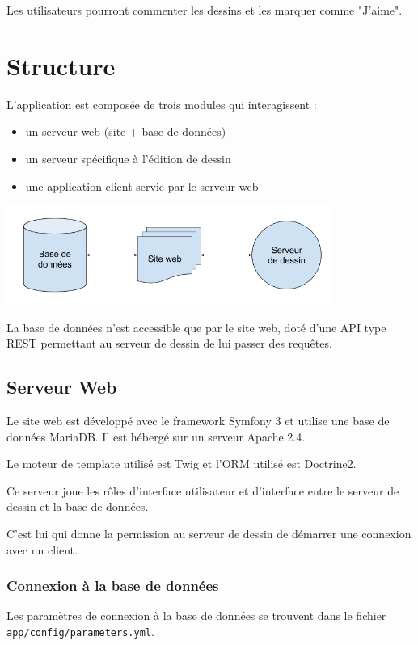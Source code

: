 \documentclass[a4paper]{article}
\begin{document}
Les utilisateurs pourront commenter les dessins et les marquer comme "J'aime".

\section{Structure}
L'application est composée de trois modules qui interagissent :
\begin{itemize}
	\item un serveur web (site + base de données)
	\item un serveur spécifique à l'édition de dessin
	\item une application client servie par le serveur web
\end{itemize}

\begin{center}
	\includegraphics[width=0.8\textwidth]{sketcher_global_structure.png}
\end{center}

La base de données n'est accessible que par le site web, doté d'une API type REST permettant au serveur de dessin de lui passer des requêtes.

\subsection{Serveur Web}
Le site web est développé avec le framework \cite{Symfony}Symfony 3 et utilise une base de données MariaDB. Il est hébergé sur un serveur Apache 2.4.

Le moteur de template utilisé est Twig et l'ORM utilisé est Doctrine2.

Ce serveur joue les rôles d'interface utilisateur et d'interface entre le serveur de dessin et la base de données.

C'est lui qui donne la permission au serveur de dessin de démarrer une connexion avec un client.

\subsubsection{Connexion à la base de données}
Les paramètres de connexion à la base de données se trouvent dans le fichier \texttt{app/config/parameters.yml}.
\end{document}
